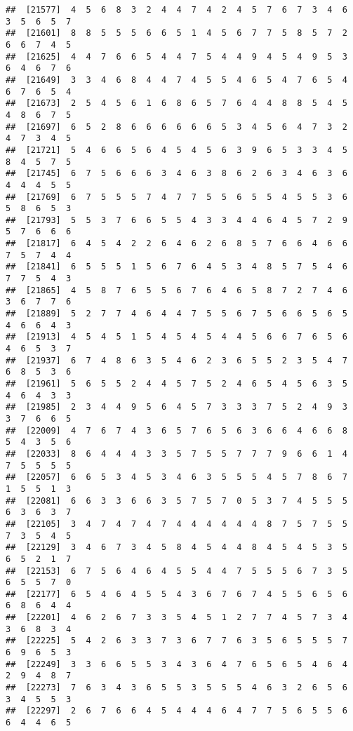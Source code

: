 \documentclass[
]{book}
\begin{document}
\begin{verbatim}
##  [21577]  4  5  6  8  3  2  4  4  7  4  2  4  5  7  6  7  3  4  6  3  5  6  5  7
##  [21601]  8  8  5  5  5  6  6  5  1  4  5  6  7  7  5  8  5  7  2  6  6  7  4  5
##  [21625]  4  4  7  6  6  5  4  4  7  5  4  4  9  4  5  4  9  5  3  6  4  6  7  6
##  [21649]  3  3  4  6  8  4  4  7  4  5  5  4  6  5  4  7  6  5  4  6  7  6  5  4
##  [21673]  2  5  4  5  6  1  6  8  6  5  7  6  4  4  8  8  5  4  5  4  8  6  7  5
##  [21697]  6  5  2  8  6  6  6  6  6  6  5  3  4  5  6  4  7  3  2  4  7  3  4  5
##  [21721]  5  4  6  6  5  6  4  5  4  5  6  3  9  6  5  3  3  4  5  8  4  5  7  5
##  [21745]  6  7  5  6  6  6  3  4  6  3  8  6  2  6  3  4  6  3  6  4  4  4  5  5
##  [21769]  6  7  5  5  5  7  4  7  7  5  5  6  5  5  4  5  5  3  6  5  8  6  5  3
##  [21793]  5  5  3  7  6  6  5  5  4  3  3  4  4  6  4  5  7  2  9  5  7  6  6  6
##  [21817]  6  4  5  4  2  2  6  4  6  2  6  8  5  7  6  6  4  6  6  7  5  7  4  4
##  [21841]  6  5  5  5  1  5  6  7  6  4  5  3  4  8  5  7  5  4  6  7  7  5  4  3
##  [21865]  4  5  8  7  6  5  5  6  7  6  4  6  5  8  7  2  7  4  6  3  6  7  7  6
##  [21889]  5  2  7  7  4  6  4  4  7  5  5  6  7  5  6  6  5  6  5  4  6  6  4  3
##  [21913]  4  5  4  5  1  5  4  5  4  5  4  4  5  6  6  7  6  5  6  4  6  5  3  7
##  [21937]  6  7  4  8  6  3  5  4  6  2  3  6  5  5  2  3  5  4  7  6  8  5  3  6
##  [21961]  5  6  5  5  2  4  4  5  7  5  2  4  6  5  4  5  6  3  5  4  6  4  3  3
##  [21985]  2  3  4  4  9  5  6  4  5  7  3  3  3  7  5  2  4  9  3  3  7  6  6  5
##  [22009]  4  7  6  7  4  3  6  5  7  6  5  6  3  6  6  4  6  6  8  5  4  3  5  6
##  [22033]  8  6  4  4  4  3  3  5  7  5  5  7  7  7  9  6  6  1  4  7  5  5  5  5
##  [22057]  6  6  5  3  4  5  3  4  6  3  5  5  5  4  5  7  8  6  7  1  5  5  1  3
##  [22081]  6  6  3  3  6  6  3  5  7  5  7  0  5  3  7  4  5  5  5  6  3  6  3  7
##  [22105]  3  4  7  4  7  4  7  4  4  4  4  4  4  8  7  5  7  5  5  7  3  5  4  5
##  [22129]  3  4  6  7  3  4  5  8  4  5  4  4  8  4  5  4  5  3  5  6  5  2  1  7
##  [22153]  6  7  5  6  4  6  4  5  5  4  4  7  5  5  5  6  7  3  5  6  5  5  7  0
##  [22177]  6  5  4  6  4  5  5  4  3  6  7  6  7  4  5  5  6  5  6  6  8  6  4  4
##  [22201]  4  6  2  6  7  3  3  5  4  5  1  2  7  7  4  5  7  3  4  3  6  8  3  4
##  [22225]  5  4  2  6  3  3  7  3  6  7  7  6  3  5  6  5  5  5  7  6  9  6  5  3
##  [22249]  3  3  6  6  5  5  3  4  3  6  4  7  6  5  6  5  4  6  4  2  9  4  8  7
##  [22273]  7  6  3  4  3  6  5  5  3  5  5  5  4  6  3  2  6  5  6  3  4  5  5  3
##  [22297]  2  6  7  6  6  4  5  4  4  4  6  4  7  7  5  6  5  5  6  6  4  4  6  5

\end{verbatim}
\end{document}
